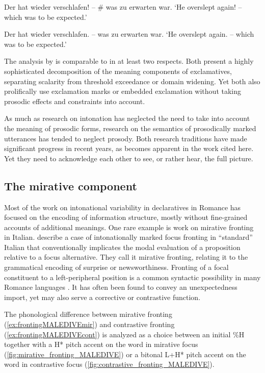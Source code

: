 \begin{exe}
	\ex \label{ex:exclamativeexpected2}
		Der hat wieder verschlafen! – \# was zu erwarten war. 
	\glt `He overslept again! – which was to be expected.' 

	\ex \label{ex:declarativeexpected}
		 Der hat wieder verschlafen. – was zu erwarten war. 
	\glt `He overslept again. – which was to be expected.' 
\end{exe}

The analysis by \citet{Grosz.2012} is comparable to \citet{ZanuttiniPortner2003} in at least two respects. Both present a highly sophisticated decomposition of the meaning components of exclamatives, separating scalarity from threshold exceedance or domain widening. Yet both also prolifically use exclamation marks or embedded exclamation without taking prosodic effects and constraints into account. 

As much as research on intonation has neglected the need to take into account the meaning of prosodic forms, research on the semantics of prosodically marked utterances has tended to neglect prosody. Both research traditions have made significant progress in recent years, as becomes apparent in the work cited here. Yet they need to acknowledge each other to see, or rather hear, the full picture.

\subsection{The mirative component}
\label{ch:3.1.2}

Most of the work on intonational variability in declaratives in Romance has focused on the encoding of information structure, mostly without fine-grained accounts of additional meanings. One rare example is work on mirative fronting in Italian. \citet{BianchiBocciCruschina.2016} describe a case of intonationally marked focus fronting in ``standard'' Italian that conventionally implicates the modal evaluation of a proposition relative to a focus alternative. They call it mirative fronting, relating it to the grammatical encoding of surprise or newsworthiness. Fronting of a focal constituent to a left-peripheral position is a common syntactic possibility in many Romance languages \citep{Leonetti.2009,Huelsmann.2019}. It has often been found to convey an unexpectedness import, yet may also serve a corrective or contrastive function.

The phonological difference between mirative fronting (\ref{ex:frontingMALEDIVEmir}) and contrastive fronting (\ref{ex:frontingMALEDIVEcont}) is analyzed as a choice 
between an initial \%H together with a H* pitch accent on the word in mirative focus (\autoref{fig:mirative_fronting_MALEDIVE}) or a bitonal L+H* pitch accent on the word in contrastive focus (\autoref{fig:contrastive_fronting_MALEDIVE}).

